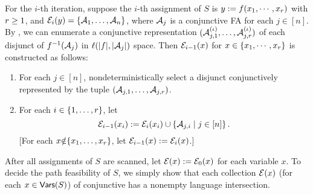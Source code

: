 
%

For the $i$-th iteration, suppose the $i$-th assignment of $S$ is $y:= f(x_1,
\cdots, x_r)$ with $r\geq 1$, and 
$\mathcal{E}_i(y)=\{\mathcal{A}_1, \ldots, \mathcal{A}_n\}$, 
where $\mathcal{A}_j$ is a conjunctive FA for each $j \in [n]$.
By \prerec{}, we can enumerate a conjunctive representation
$(\mathcal{A}^{(\iota)}_{j, 1}, \ldots, \mathcal{A}^{(\iota)}_{j, r})$ of
each disjunct of
$f^{-1}(\mathcal{A}_j)$ in $\ell(|f|,|\mathcal{A}_j|)$ space.
Then $\mathcal{E}_{i-1}(x)$ for $x \in  \{x_1,\cdots, x_r\}$ is constructed as follows: %
\begin{enumerate}
\item For each $j \in [n]$, nondeterministically select a disjunct 
    conjunctively represented by the tuple
    $\left(\mathcal{A}_{j, 1}, \ldots, \mathcal{A}_{j, r}\right)$.
%
\item For each $i \in \{1,\ldots, r\}$, let
\[
    \mathcal{E}_{i-1}(x_i):= \mathcal{E}_{i}(x_i) \cup \left\{\mathcal{A}_{j, i} \mid  j \in [n]
        \right\}.
\]
[For each $x{\notin} \{x_1,\ldots, x_r\}$, let $\mathcal{E}_{i-1}(x) := 
        \mathcal{E}_i(x)$.]
%
\end{enumerate}
%
After all assignments of $S$ are scanned,  let $\mathcal{E}(x):=\mathcal{E}_{0}(x)$ for each variable $x$.
To decide the path feasibility of $S$, we simply show that each collection
$\mathcal{E}(x)$ (for each $x \in \mathsf{Vars}(S)$) of conjunctive \FA{} has a nonempty 
language intersection.


